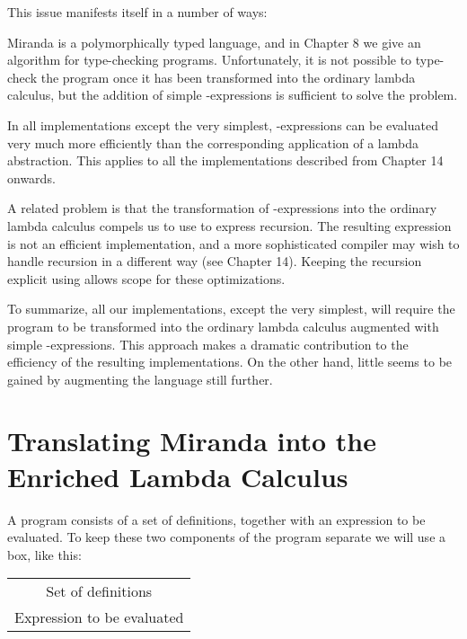 This issue manifests itself in a number of ways:
\begin{numbered}
    \item Miranda is a polymorphically typed language, and in Chapter 8 we give an algorithm for type-checking programs. Unfortunately, it is not possible to type-check the program once it has been transformed into the ordinary lambda calculus, but the addition of simple -expressions is sufficient to solve the problem.
    \item In all implementations except the very simplest, -expressions can be evaluated very much more efficiently than the corresponding application of a lambda abstraction. This applies to all the implementations described from Chapter 14 onwards.
    \item A related problem is that the transformation of -expressions into the ordinary lambda calculus compels us to use  to express recursion. The resulting expression is not an efficient implementation, and a more
    sophisticated compiler may wish to handle recursion in a different way
    (see Chapter 14). Keeping the recursion explicit using  allows scope
    for these optimizations.
\end{numbered}

To summarize, all our implementations, except the very simplest, will require the program to be transformed into the ordinary lambda calculus augmented with simple -expressions. This approach makes a dramatic contribution to the efficiency of the resulting implementations. On the other hand, little seems to be gained by augmenting the language still further.

\section{Translating Miranda into the Enriched Lambda Calculus}
A program consists of a set of definitions, together with an expression to be evaluated. To keep these two components of the program separate we will use a box, like this:

\begin{center}
\setlength{\tabcolsep}{18pt}
\renewcommand{\arraystretch}{1.5}
\begin{tabular}{|c|}
    \hline
    Set of definitions \\
    \hdashline
    Expression to be evaluated \\
    \hline
\end{tabular}
\end{center}

